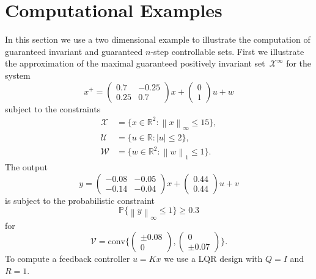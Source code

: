 \documentclass{ifacconf}
\providecommand{\abs}[1]{\left|#1\right|}
\providecommand{\norm}[1]{\left\|#1\right\|}
\providecommand{\conv}{\text{conv}}
\providecommand{\W}{\mathcal W}
\providecommand{\V}{\mathcal V}
\providecommand{\X}{\mathcal X}
\providecommand{\U}{\mathcal U}
\providecommand{\PP}{\mathbb P}
\providecommand{\RR}{\mathbb R}
\begin{document}
\section{Computational Examples}\label{sec:examples}
%
%
%
In this section we use a two dimensional example to illustrate the computation of guaranteed invariant and guaranteed $n$-step controllable sets.
%
First we illustrate the approximation of the maximal guaranteed positively invariant set~$\X^\infty$ for the system
%
\begin{equation}\label{eq:example:system:MRPI}
	x^+ = \begin{pmatrix}0.7&-0.25\\0.25&0.7\end{pmatrix}x+\begin{pmatrix}0\\1\end{pmatrix}u+w
\end{equation}
%
subject to the constraints 
\begin{equation}\label{eq:example:rconstriaints}
\begin{aligned}
\X &= \{x\in\RR^2 :\norm{x}_\infty\leq15\}, \\
\U &= \{u\in\RR :\abs{u}\leq2\}, \\
\W &= \{w\in\RR^2 :\norm{w}_1\leq1\}.
\end{aligned}
\end{equation}
%
The output 
%
\[%
	y = \begin{pmatrix}-0.08&-0.05\\
   -0.14&   -0.04\end{pmatrix}x + \begin{pmatrix}
0.44\\0.44\end{pmatrix}u + v
\]%
%
is subject to the probabilistic constraint
%
\begin{equation}\label{eq:example:pconstriaint}
	\PP\{\norm{y}_\infty\leq 1\}\geq 0.3
\end{equation}
%
for 
%
$$
\V = \conv\biggl\{\begin{pmatrix}\pm0.08\\0\end{pmatrix},\begin{pmatrix}0\\\pm0.07\end{pmatrix}\biggr\}.
$$
%
To compute a feedback controller $u=Kx$ we use a LQR design with $Q=I$ and $R=1$.
\end{document}
